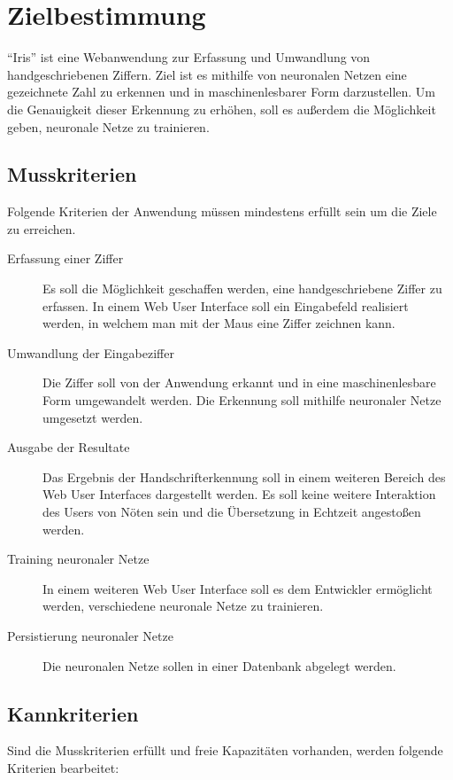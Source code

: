 \section{Zielbestimmung}
"`Iris"' ist eine Webanwendung zur Erfassung und Umwandlung von handgeschriebenen Ziffern. Ziel ist es mithilfe von neuronalen Netzen eine gezeichnete Zahl zu erkennen und in maschinenlesbarer Form darzustellen.
Um die Genauigkeit dieser Erkennung zu erhöhen, soll es außerdem die Möglichkeit geben, neuronale Netze zu trainieren.
 
\subsection{Musskriterien}

Folgende Kriterien der Anwendung müssen mindestens erfüllt sein um die Ziele zu erreichen.

\begin{description}
\item [Erfassung einer Ziffer]
Es soll die Möglichkeit geschaffen werden, eine handgeschriebene Ziffer zu erfassen. In einem Web User Interface soll ein Eingabefeld realisiert werden,
in welchem man mit der Maus eine Ziffer zeichnen kann.
\item [Umwandlung der Eingabeziffer]
Die Ziffer soll von der Anwendung erkannt und in eine maschinenlesbare Form umgewandelt werden. Die Erkennung soll mithilfe neuronaler Netze umgesetzt werden.
\item [Ausgabe der Resultate]
Das Ergebnis der Handschrifterkennung soll in einem weiteren Bereich des Web User Interfaces dargestellt werden. Es soll keine weitere Interaktion des Users von Nöten sein und die Übersetzung in Echtzeit angestoßen werden.
\item [Training neuronaler Netze]
In einem weiteren Web User Interface soll es dem Entwickler ermöglicht werden, verschiedene neuronale Netze zu trainieren.
\item [Persistierung neuronaler Netze]
Die neuronalen Netze sollen in einer Datenbank abgelegt werden.
\end{description}
 
\subsection{Kannkriterien}

Sind die Musskriterien erfüllt und freie Kapazitäten vorhanden, werden folgende Kriterien bearbeitet:

